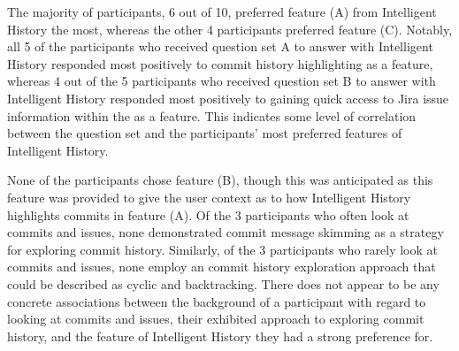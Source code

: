 The majority of participants, 6 out of 10, preferred feature (A) from Intelligent History the most,
whereas the other 4 participants preferred feature (C).
Notably, all 5 of the participants who received question set A to answer with Intelligent History responded most positively to commit history highlighting as a feature, 
whereas 4 out of the 5 participants who received question set B to answer with Intelligent History responded most positively to gaining quick access to Jira issue information within the  as a feature.
This indicates some level of correlation between the question set and the participants' most preferred features of Intelligent History.

None of the participants chose feature (B), though this was anticipated as this feature was provided to give the user context as to how Intelligent History highlights commits in feature (A).
Of the 3 participants who often look at commits and issues, none demonstrated commit message skimming as a strategy for exploring commit history.
Similarly, of the 3 participants who rarely look at commits and issues, none employ an commit history exploration approach that could be described as cyclic and backtracking.
There does not appear to be any concrete associations between the background of a participant with regard to looking at commits and issues,
their exhibited approach to exploring commit history, and the feature of Intelligent History they had a strong preference for.

